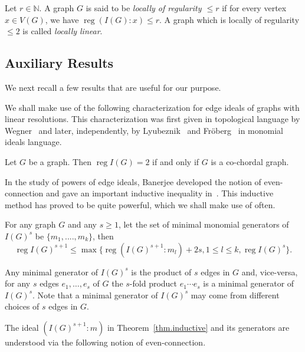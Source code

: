 \documentclass[ALCO,ThmDefs,Unicode,epreuves]{cedram}
\DeclareMathOperator{\reg}{reg}
\newcommand{\NN}{{\mathbb N}}
\newcommand*{\reg}{\mathrm{reg}}
\begin{document}
\begin{defi} Let $r \in \NN$. A graph $G$ is said to be \emph{locally of regularity $\le r$} if for every vertex $x \in V(G)$, we have $\reg (I(G):x) \le r$. A graph which is locally of regularity $\le 2$ is called \emph{locally linear}.
\end{defi}

\subsection{Auxiliary Results} 
We next recall a few results that are useful for our purpose.

We shall make use of the following characterization for edge ideals of graphs with linear resolutions. This characterization was first given in topological language by Wegner~\cite{Wegner} and later, independently, by Lyubeznik~\cite{L} and Fr\"oberg~\cite{Fr} in monomial ideals language.

\begin{theo} \label{thm.regtwo}
Let $G$ be a graph. Then $\reg I(G) = 2$ if and only if $G$ is a co-chordal graph.
\end{theo}


In the study of powers of edge ideals, Banerjee developed the notion of even-connection and gave an important inductive inequality in~\cite{Ba}. This inductive method has proved to be quite powerful, which we shall make use of often.

\begin{theo}\label{thm.inductive}
For any graph $G$ and any $s\geq 1$, let the set of minimal monomial generators of $I(G)^s$ be $\{m_1,....,m_k\}$, then \[
\reg I(G)^{s+1} \leq \max \{ \reg (I(G)^{s+1} : m_l)+2s, 1\leq l \leq k, \reg I(G)^s\}.
\]

\end{theo}

\begin{rema}
Any minimal generator of $I(G)^s$ is the product of $s$ edges in $G$ and, vice-versa, for any $s$ edges $e_1, \ldots, e_s$ of $G$ the $s$-fold product $e_1 \cdots e_s$ is a minimal generator of $I(G)^s$. Note that a minimal generator of $I(G)^s$ may come from different choices of $s$ edges in $G$. 
\end{rema}

 The ideal $(I(G)^{s+1}: m)$ in Theorem~\ref{thm.inductive} and its generators are understood via the following notion of even-connection.
\end{document}
